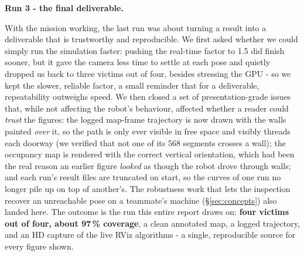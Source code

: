 \documentclass[11pt,a4paper]{article}
\newcommand{\head}[1]{\par\smallskip\noindent\textbf{\color{nccblue}#1}\par}
\begin{document}
\head{Run 3 - the final deliverable.} With the mission working, the last run was about turning a result
into a deliverable that is trustworthy and reproducible. We first asked whether we could simply run the
simulation faster: pushing the real-time factor to 1.5 did finish sooner, but it gave the camera less
time to settle at each pose and quietly dropped us back to three victims out of four, besides stressing
the GPU - so we kept the slower, reliable factor, a small reminder that for a deliverable, repeatability
outweighs speed. We then closed a set of presentation-grade issues that, while not affecting the robot's
behaviour, affected whether a reader could \emph{trust} the figures: the logged map-frame trajectory is
now drawn with the walls painted \emph{over} it, so the path is only ever visible in free space and
visibly threads each doorway (we verified that not one of its 568 segments crosses a wall); the
occupancy map is rendered with the correct vertical orientation, which had been the real reason an
earlier figure \emph{looked} as though the robot drove through walls; and each run's result files are
truncated on start, so the curves of one run no longer pile up on top of another's. The robustness work
that lets the inspection recover an unreachable pose on a teammate's machine (\S\ref{sec:concepts}) also
landed here. The outcome is the run this entire report draws on: \textbf{four victims out of four, about
97\,\% coverage}, a clean annotated map, a logged trajectory, and an HD capture of the live RViz
algorithms - a single, reproducible source for every figure shown.
\end{document}
